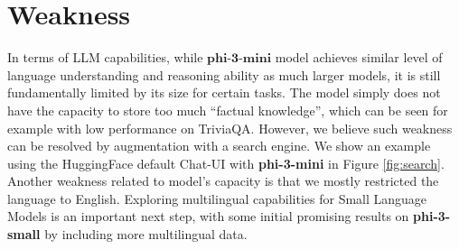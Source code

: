\documentclass[11pt]{article}
\begin{document}

\section{Weakness}
In terms of LLM capabilities, while $\textbf{phi-3-mini}$ model achieves similar level of language understanding and reasoning ability as much larger models, it is still fundamentally limited by its size for certain tasks. The model simply does not have the capacity to store too much ``factual knowledge'', which can be seen for example with low performance on TriviaQA.
However, we believe such weakness can be resolved by augmentation with a search engine. We show an example using the HuggingFace default Chat-UI with \textbf{phi-3-mini} in Figure \ref{fig:search}. Another weakness related to model's capacity is that we mostly restricted the language to English. Exploring multilingual capabilities for Small Language Models is an important next step, with some initial promising results on \textbf{phi-3-small} by including more multilingual data.
\end{document}
